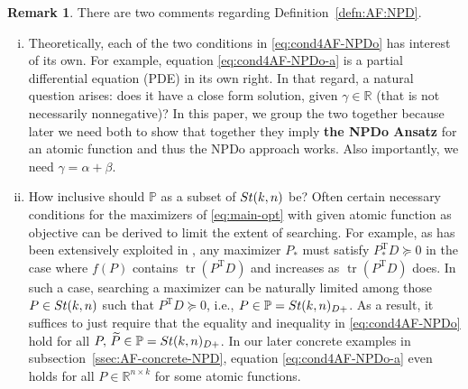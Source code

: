 \documentclass[11pt]{article}
\def\bbP{\mathbb{P}}
\def\bbR{\mathbb{R}}
\def\wtd{\widetilde}
\newcommand\STM[2]{{\rm St}(#1,#2)}
\DeclareMathOperator{\tr}{tr}
\DeclareMathOperator{\T}{T}
\theoremstyle{definition}
\newtheorem{remark}{Remark}[section]
\numberwithin{equation}{section}
\begin{document}
\begin{remark}\label{rk:cond4AF-NPDo}
There are two comments regarding Definition~\ref{defn:AF:NPD}.
\begin{enumerate}[(i)]
  \item Theoretically, each of the two conditions in \eqref{eq:cond4AF-NPDo} has interest of its own. For example, equation \eqref{eq:cond4AF-NPDo-a}
        is a partial differential equation (PDE) in its own right. In that regard, a natural question arises:
        does it have a close form solution, given $\gamma\in\bbR$ (that is not necessarily nonnegative)?
        In this paper, we group the two together because later we need both  to show that
        together they imply {\bf the NPDo Ansatz} for an atomic function and thus the NPDo approach works.
        Also importantly, we need $\gamma=\alpha+\beta$.
  \item How inclusive should $\bbP$ as a subset of $\STM{k}{n}$ be?
        Often certain
        necessary conditions for the maximizers of \eqref{eq:main-opt} with given atomic function as objective can be derived to limit the extent of searching. For example, as has been
        extensively exploited in \cite{zhwb:2022,wazl:2023,wazl:2022a,zhys:2020,luli:2024}, any maximizer $P_*$ must satisfy
        $P_*^{\T}D\succeq 0$ in the case where $f(P)$ contains $\tr(P^{\T}D)$ and increases as $\tr(P^{\T}D)$ does. In such a case,
        searching a maximizer can be naturally limited among those $P\in\STM{k}{n}$ such that $P^{\T}D\succeq 0$, i.e.,
        $P\in\bbP=\STM{k}{n}_{D+}$.
        As a result, it suffices to just require that the equality and inequality in \eqref{eq:cond4AF-NPDo} hold
        for all $P,\,\wtd P\in\bbP=\STM{k}{n}_{D+}$.
        In our later concrete examples in subsection~\ref{ssec:AF-concrete-NPD}, equation \eqref{eq:cond4AF-NPDo-a} even holds
        for all $P\in\bbR^{n\times k}$ for some atomic functions.
\end{enumerate}
\end{remark}
\end{document}
